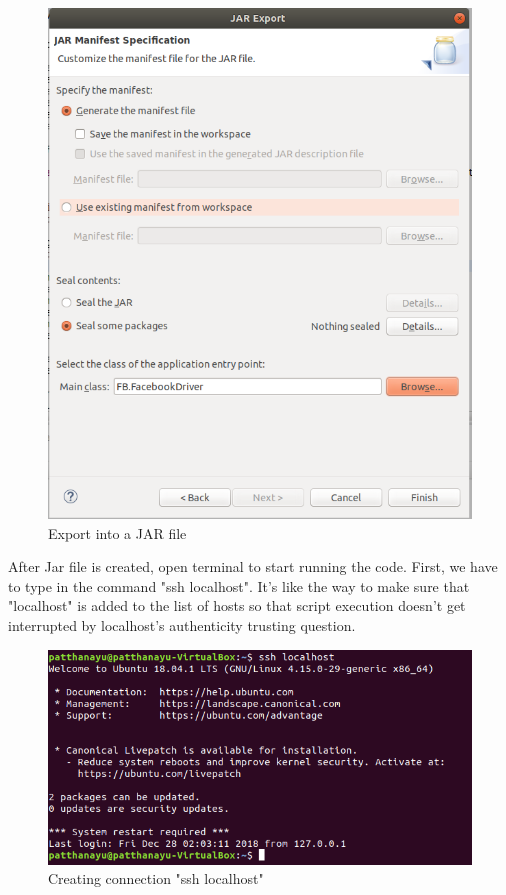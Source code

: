 \documentclass[11pt]{article}
\begin{document}
\begin{figure}[h]
\includegraphics[scale=0.45]{res2}
\caption{Export into a JAR file}
\end{figure}

After Jar file is created, open terminal to start running the code. First, we have to type in the command "ssh localhost". It's like the way to make sure that "localhost" is added to the list of hosts so that script execution doesn't get interrupted by localhost's authenticity trusting question\cite{loc}.

\begin{figure}[h]
\centering
\includegraphics[scale=0.55]{in4}
\caption{Creating connection "ssh localhost"}
\end{figure}
\end{document}
